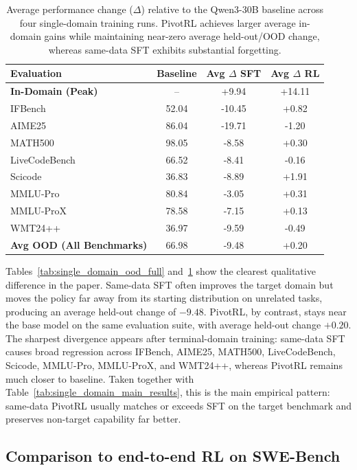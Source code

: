 \begin{table}[t]
\centering
\small
\begin{tabular}{l c cc}
\toprule
\textbf{Evaluation} & \textbf{Baseline} & \textbf{Avg $\Delta$ SFT} & \textbf{Avg $\Delta$ RL} \\
\midrule
\textbf{In-Domain (Peak)} & -- & +9.94 & +14.11 \\
\midrule
IFBench        & 52.04 & -10.45 & +0.82 \\
AIME25         & 86.04 & -19.71 & -1.20 \\
MATH500        & 98.05 & -8.58  & +0.30 \\
LiveCodeBench  & 66.52 & -8.41  & -0.16 \\
Scicode        & 36.83 & -8.89  & +1.91 \\
MMLU-Pro       & 80.84 & -3.05  & +0.31 \\
MMLU-ProX      & 78.58 & -7.15  & +0.13 \\
WMT24++        & 36.97 & -9.59  & -0.49 \\
\midrule
\textbf{Avg OOD (All Benchmarks)} & 66.98 & -9.48 & +0.20 \\
\bottomrule
\end{tabular}
\caption{
Average performance change ($\Delta$) relative to the Qwen3-30B baseline across four single-domain training runs.
PivotRL achieves larger average in-domain gains while maintaining near-zero average held-out/OOD change, whereas same-data SFT exhibits substantial forgetting.
}
\label{tab:single_domain_ood_avg}
\end{table}

Tables~\ref{tab:single_domain_ood_full} and~\ref{tab:single_domain_ood_avg} show the clearest qualitative difference in the paper. Same-data SFT often improves the target domain but moves the policy far away from its starting distribution on unrelated tasks, producing an average held-out change of $-9.48$. PivotRL, by contrast, stays near the base model on the same evaluation suite, with average held-out change $+0.20$. The sharpest divergence appears after terminal-domain training: same-data SFT causes broad regression across IFBench, AIME25, MATH500, LiveCodeBench, Scicode, MMLU-Pro, MMLU-ProX, and WMT24++, whereas PivotRL remains much closer to baseline. Taken together with Table~\ref{tab:single_domain_main_results}, this is the main empirical pattern: same-data PivotRL usually matches or exceeds SFT on the target benchmark and preserves non-target capability far better.

\subsection{Comparison to end-to-end RL on SWE-Bench}
\label{sec:swe_e2e}

